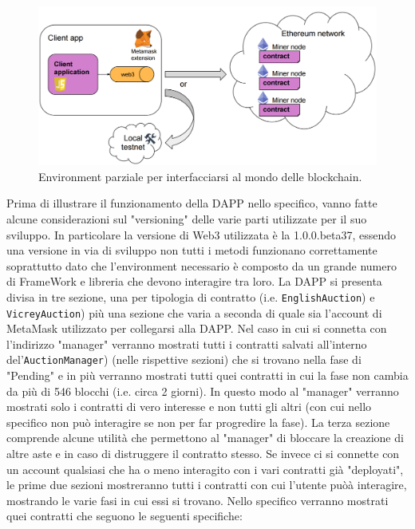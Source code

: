 \begin{figure}[h]
	\centering
	\includegraphics[scale=0.3]{suite.png}
	\caption{Environment parziale per interfacciarsi al mondo delle blockchain.}\label{fig1.2}
\end{figure}
Prima di illustrare il funzionamento della DAPP nello specifico, vanno fatte alcune considerazioni sul "versioning" delle varie parti utilizzate per il suo sviluppo. In particolare la versione di Web3 utilizzata è la 1.0.0.beta37, essendo una versione in via di sviluppo non tutti i metodi funzionano correttamente soprattutto dato che l'environment necessario è composto da un grande numero di FrameWork e libreria che devono interagire tra loro.\newline
La DAPP si presenta divisa in tre sezione, una per tipologia di contratto (i.e. \texttt{EnglishAuction}) e \texttt{VicreyAuction}) più una sezione che varia a seconda di quale sia l'account di MetaMask utilizzato per collegarsi alla DAPP. Nel caso in cui si connetta con l'indirizzo "manager" verranno mostrati tutti i contratti salvati all'interno del'\texttt{AuctionManager}) (nelle rispettive sezioni) che si trovano nella fase di "Pending" e in più verranno mostrati tutti quei contratti in cui la fase non cambia da più di 546 blocchi (i.e. circa 2 giorni). In questo modo al "manager" verranno mostrati solo i contratti di vero interesse e non tutti gli altri (con cui nello specifico non può interagire se non per far progredire la fase). La terza sezione comprende alcune utilità che permettono al "manager" di bloccare la creazione di altre aste e in caso di distruggere il contratto stesso.\newline
Se invece ci si connette con un account qualsiasi che ha o meno interagito con i vari contratti già "deployati", le prime due sezioni mostreranno tutti i contratti con cui l'utente puòà interagire, mostrando le varie fasi in cui essi si trovano. Nello specifico verranno mostrati quei contratti che seguono le seguenti specifiche:\newline
